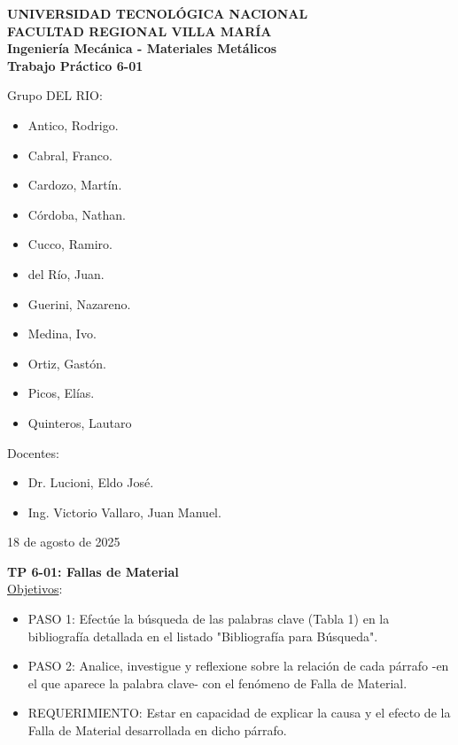 \documentclass[12pt,a4paper]{article}
\begin{document}

\begin{titlepage}
    \centering
    {\Large \textbf{UNIVERSIDAD TECNOLÓGICA NACIONAL}}\\
    {\Large \textbf{FACULTAD REGIONAL VILLA MARÍA}}\\[2cm]
    {\LARGE \textbf{Ingeniería Mecánica - Materiales Metálicos}}\\[2cm]
    {\huge \textbf{Trabajo Práctico 6-01}}\\[1.5cm]

\raggedright
Grupo DEL RIO:
\begin{itemize}
    \item Antico, Rodrigo.
    \item Cabral, Franco.
    \item Cardozo, Martín.
    \item Córdoba, Nathan.
    \item Cucco, Ramiro.
    \item del Río, Juan.
    \item Guerini, Nazareno.
    \item Medina, Ivo.
    \item Ortiz, Gastón.
    \item Picos, Elías.
    \item Quinteros, Lautaro
\end{itemize}
 Docentes:
 \begin{itemize}
     \item Dr. Lucioni, Eldo José.
     \item  Ing. Victorio Vallaro, Juan Manuel.\\[1cm]
 \end{itemize}
 
\begin{center}
18 de agosto de 2025
\end{center}
 
    \vfill
\end{titlepage}

\newpage

{\Large{\textbf{TP 6-01: Fallas de Material}}}\\[0.1cm]

{\Large{\uline{Objetivos}}:}

\begin{itemize}
  \renewcommand{\labelitemi}{}
  \item PASO 1: Efectúe la búsqueda de las palabras clave (Tabla 1) en la 
bibliografía detallada en el listado "Bibliografía para Búsqueda".
  \item PASO 2: Analice, investigue y reflexione sobre la relación de cada 
párrafo -en el que aparece la palabra clave- con el fenómeno de Falla 
de Material.
  \item REQUERIMIENTO: Estar en capacidad de explicar la causa y el efecto 
de la Falla de Material desarrollada en dicho párrafo.
\end{itemize}
\end{document}
